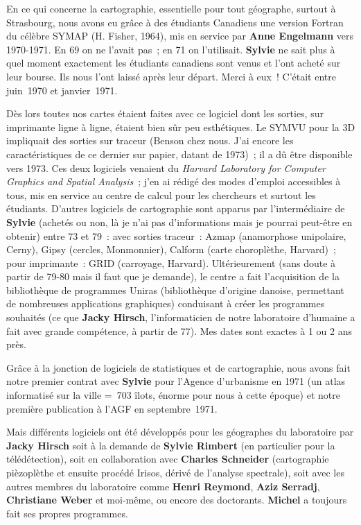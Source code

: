 En ce qui concerne la cartographie, essentielle pour tout géographe, surtout à Strasbourg, nous avons eu grâce à des étudiants Canadiens une version Fortran du célèbre SYMAP (H. Fisher, 1964), mis en service par \textbf{Anne Engelmann} vers 1970-1971. En 69 on ne l’avait pas ; en 71 on l’utilisait. \textbf{Sylvie} ne sait plus à quel moment exactement les étudiants canadiens sont venus et l’ont acheté sur leur bourse. Ils nous l’ont laissé après leur départ. Merci à eux ! C’était entre juin 1970 et janvier 1971.

Dès lors toutes nos cartes étaient faites avec ce logiciel dont les sorties, sur imprimante ligne à ligne, étaient bien sûr peu esthétiques. Le SYMVU pour la 3D impliquait des sorties sur traceur (Benson chez nous. J’ai encore les caractéristiques de ce dernier sur papier, datant de 1973) ; il a dû être disponible vers 1973. Ces deux logiciels venaient du \textit{Harvard Laboratory for Computer Graphics and Spatial Analysis} ; j’en ai rédigé des modes d’emploi accessibles à tous, mis en service au centre de calcul pour les chercheurs et surtout les étudiants. D’autres logiciels de cartographie sont apparus par l’intermédiaire de \textbf{Sylvie} (achetés ou non, là je n’ai pas d’informations mais je pourrai peut-être en obtenir) entre 73 et 79 : avec sorties traceur : Azmap (anamorphose unipolaire, Cerny), Gipsy (cercles, Monmonnier), Calform (carte choroplèthe, Harvard) ; pour imprimante : GRID (carroyage, Harvard). Ultérieurement (sans doute à partir de 79-80 mais il faut que je demande), le centre a fait l’acquisition de la bibliothèque de programmes Uniras (bibliothèque d’origine danoise, permettant de nombreuses applications graphiques) conduisant à créer les programmes souhaités (ce que \textbf{Jacky Hirsch}, l’informaticien de notre laboratoire d’humaine a fait avec grande compétence, à partir de 77). Mes dates sont exactes à 1 ou 2 ans près.

Grâce à la jonction de logiciels de statistiques et de cartographie, nous avons fait notre premier contrat avec \textbf{Sylvie} pour l’Agence d’urbanisme en 1971 (un atlas informatisé sur la ville = 703 îlots, énorme pour nous à cette époque) et notre première publication à l’AGF en septembre 1971.

Mais différents logiciels ont été développés pour les géographes du laboratoire par \textbf{Jacky Hirsch} soit à la demande de \textbf{Sylvie Rimbert} (en particulier pour la télédétection), soit en collaboration avec \textbf{Charles Schneider} (cartographie pièzoplèthe et ensuite procédé Irisos, dérivé de l’analyse spectrale), soit avec les autres membres du laboratoire comme \textbf{Henri Reymond}, \textbf{Aziz Serradj}, \textbf{Christiane Weber} et moi-même, ou encore des doctorants. \textbf{Michel} a toujours fait ses propres programmes.

